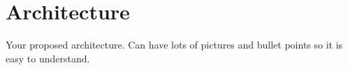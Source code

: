 
% 
% 
\section{Architecture}
\label{sec:architecture}

Your proposed architecture. Can have lots of pictures and bullet points so it is easy to understand.





